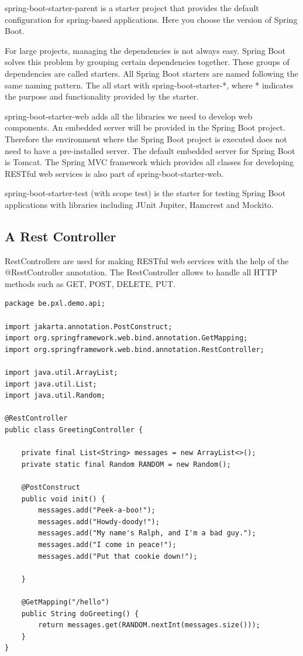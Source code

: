 \documentclass[a4paper, 12pt]{report}
\begin{document}
spring-boot-starter-parent is a starter project that provides the default configuration for spring-based applications. Here you choose the version of Spring Boot.

For large projects, managing the dependencies is not always easy. Spring Boot solves this problem by grouping certain dependencies together. These groups of dependencies are called starters. All Spring Boot starters are named following the same naming pattern. The all start with spring-boot-starter-*, where * indicates the purpose and functionality provided by the starter.

spring-boot-starter-web adds all the libraries we need to develop web components. An embedded server will be provided in the Spring Boot project. Therefore the environment where the Spring Boot project is executed does not need to have a pre-installed server. The default embedded server for Spring Boot is Tomcat. The Spring MVC framework which provides all classes for developing RESTful web services is also part of spring-boot-starter-web.

spring-boot-starter-test (with scope test) is the starter for testing Spring Boot applications with libraries including JUnit Jupiter, Hamcrest and Mockito.

\subsection{A Rest Controller}

RestControllers are used for making RESTful web services with the help of the @RestController annotation. The RestController allows to handle all HTTP methods such as GET, POST, DELETE, PUT. 

\begin{lstlisting}[frame=single]
package be.pxl.demo.api;

import jakarta.annotation.PostConstruct;
import org.springframework.web.bind.annotation.GetMapping;
import org.springframework.web.bind.annotation.RestController;

import java.util.ArrayList;
import java.util.List;
import java.util.Random;

@RestController
public class GreetingController {

    private final List<String> messages = new ArrayList<>();
    private static final Random RANDOM = new Random();

    @PostConstruct
    public void init() {
        messages.add("Peek-a-boo!");
        messages.add("Howdy-doody!");
        messages.add("My name's Ralph, and I'm a bad guy.");
        messages.add("I come in peace!");
        messages.add("Put that cookie down!");

    }

    @GetMapping("/hello")
    public String doGreeting() {
        return messages.get(RANDOM.nextInt(messages.size()));
    }
}
\end{lstlisting}
\end{document}
